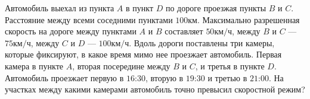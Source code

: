 Автомобиль выехал из пункта $A$ в пункт $D$ по дороге проезжая пункты $B$ и $C$. Расстояние между всеми соседними пунктами $100\unit{км}$. Максимально разрешенная скорость на дороге между пунктами $A$ и $B$ составляет $50\unit{км/ч}$, между $B$ и $C$ --- $75\unit{км/ч}$, между $C$ и $D$ --- $100\unit{км/ч}$. Вдоль дороги поставлены три камеры, которые фиксируют, в какое время мимо нее проезжает автомобиль. Первая камера в пункте $A$, вторая посередине между $B$ и $C$, и третья в пункте $D$. Автомобиль проезжает первую в $16$:$30$, вторую в $19$:$30$ и третью в $21$:$00$.  На участках между какими камерами автомобиль точно превысил скоростной режим?